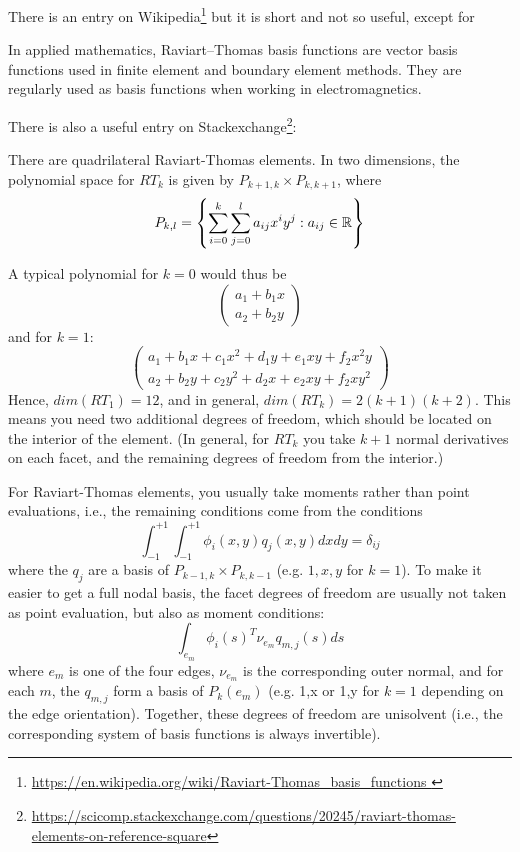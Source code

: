 There is an entry on Wikipedia\footnote{\url{
https://en.wikipedia.org/wiki/Raviart-Thomas_basis_functions
}} but it is short and not so useful, except for
\begin{displayquote}
{\color{darkgray}
In applied mathematics, Raviart–Thomas basis functions are vector basis functions used 
in finite element and boundary element methods. They are regularly used as basis 
functions when working in electromagnetics. 
}
\end{displayquote}

There is also a useful entry on Stackexchange\footnote{\url{
https://scicomp.stackexchange.com/questions/20245/raviart-thomas-elements-on-reference-square}}:
\begin{displayquote}
{\color{darkgray}
There are quadrilateral Raviart-Thomas elements. 
In two dimensions, the polynomial space for $RT_k$ is given by 
$P_{k+1,k} \times P_{k,k+1}$, where
\[
P_{k,l}=\left\{ \sum_{i=0}^{k} \sum_{j=0}^{l} a_{ij} x^i y^j: a_{ij}\in {\mathbb{R}}  \right\}
\]

A typical polynomial for $k=0$ would thus be 
\[
\left(
\begin{array}{c}
a_1+b_1 x \\
a_2+b_2 y
\end{array}
\right)
\]
and for $k=1$:
\[
\left(
\begin{array}{c}
a_1+b_1 x +c_1x^2 +d_1 y + e_1 xy  + f_2 x^2 y\\
a_2+b_2 y +c_2y^2 +d_2 x + e_2 xy  + f_2 x y^2
\end{array}
\right)
\]
Hence, $dim(RT_1)=12$, and in general, $dim(RT_k)=2(k+1)(k+2)$. 
This means you need two additional degrees of freedom, which should be located on the 
interior of the element. (In general, for $RT_k$ you take $k+1$ normal derivatives on each facet, 
and the remaining degrees of freedom from the interior.)

For Raviart-Thomas elements, you usually take moments rather than 
point evaluations, i.e., the remaining conditions come from the conditions 
\[
\int_{-1}^{+1} \int_{-1}^{+1} \phi_i(x,y)q_j(x,y)dx dy = \delta_{ij}
\]
where the ${q_j}$ are a basis of $P_{k-1,k}\times P_{k,k-1}$ (e.g. $1,x,y$ for $k=1$).
To make it easier to get a full nodal basis, the facet degrees of freedom are 
usually not taken as point evaluation, but also as moment conditions: 
\[
\int_{e_m} \phi_i(s)^T \nu_{e_m} q_{m,j}(s) ds
\]
where $e_m$ is one of the four edges, $\nu_{e_m}$ is the corresponding outer normal, 
and for each $m$, the $q_{m,j}$ form a basis of $P_k(e_m)$ (e.g. {1,x} or {1,y}
for $k=1$ depending on the edge orientation).
Together, these degrees of freedom are unisolvent (i.e., the corresponding system 
of basis functions is always invertible).
}
\end{displayquote}



